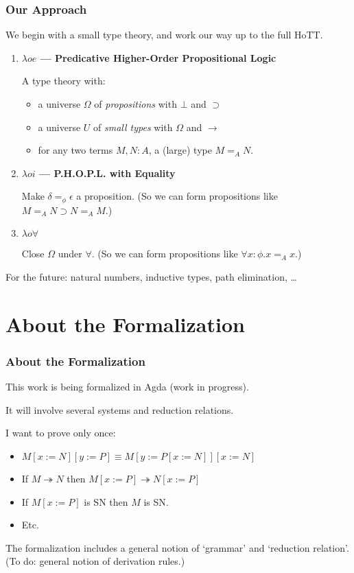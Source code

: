 \begin{frame}
\frametitle{Our Approach}
We begin with a small type theory, and work our way up to the full HoTT. %
\begin{enumerate}
\item \textbf{$\lambda o e$ --- Predicative Higher-Order Propositional Logic}

 A type theory with:
  \begin{itemize}
  \item a universe $\Omega$ of \emph{propositions} with $\bot$ and $\supset$
  \item a universe $U$ of \emph{small types} with $\Omega$ and $\rightarrow$
  \item for any two terms $M, N : A$, a (large) type $M =_A N$.
  \end{itemize}
\item \textbf{$\lambda o i$ --- P.H.O.P.L. with Equality}

Make $\delta =_\phi \epsilon$ a proposition.  (So we can form propositions like $M =_A N \supset N =_A M$.)
\item \textbf{$\lambda o \forall$} 

Close $\Omega$ under $\forall$.  (So we can form propositions like $\forall x : \phi. x =_A x$.)
\end{enumerate}
For the future: natural numbers, inductive types, path elimination, \ldots
\end{frame}

\section{About the Formalization}

\begin{frame}
\frametitle{About the Formalization}
This work is being formalized in Agda (work in progress).
\pause

It will involve several systems and reduction relations.

I want to prove only once:
\pause
\begin{itemize}[<+->]
\item
$M[x:=N][y:=P] \equiv M[y:=P[x:=N]][x:=N]$
\item
If $M \twoheadrightarrow N$ then $M[x:=P] \twoheadrightarrow N[x:=P]$
\item
If $M[x:=P]$ is SN then $M$ is SN.
\item
Etc.
\end{itemize}
\pause
The formalization includes a general notion of `grammar' and `reduction relation'.  (To do: general notion of derivation rules.)
\end{frame}

